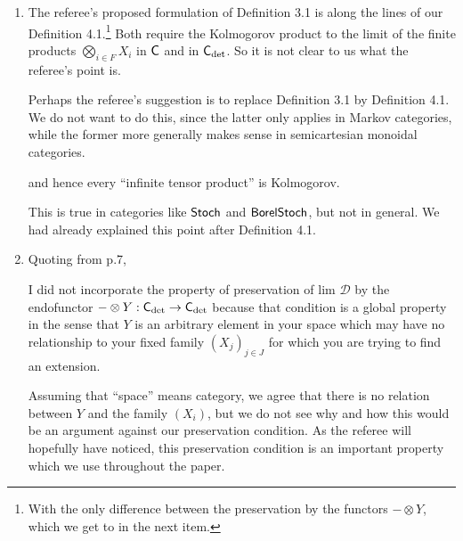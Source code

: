 \documentclass[11pt]{article}
\begin{document}
\begin{enumerate}[resume,label=(\alph*).]
	\item The referee's proposed formulation of Definition 3.1 is along the lines of our Definition 4.1.\footnote{With the only difference between the preservation by the functors $-\otimes Y$, which we get to in the next item.} Both require the Kolmogorov product to the limit of the finite products $\bigotimes_{i \in F} X_i$ in $\mathsf{C}$ and in $\mathsf{C}_{\det}$. So it is not clear to us what the referee's point is. 

		Perhaps the referee's suggestion is to replace Definition 3.1 by Definition 4.1. We do not want to do this, since the latter only applies in Markov categories, while the former more generally makes sense in semicartesian monoidal categories.
		\begin{displayquote}
			and hence every ``infinite tensor product'' is Kolmogorov.
		\end{displayquote}
		This is true in categories like $\operatorname{\mathsf{Stoch}}$ and $\operatorname{\mathsf{BorelStoch}}$, but not in general. We had already explained this point after Definition 4.1.
	\item Quoting from p.7,
		\begin{displayquote}
			I did not incorporate the property of preservation of lim $\mathcal{D}$ by the endofunctor
			$-\otimes Y : \mathsf{C}_{\det} \to \mathsf{C}_{\det}$ because that condition is a global property in the sense
		that $Y$ is an arbitrary element in your space which may have no relationship
		to your fixed family $(X_j)_{j\in J}$ for which you are trying to find an extension.
		\end{displayquote}
		Assuming that ``space'' means category, we agree that there is no relation between $Y$ and the family $(X_i)$, but we do not see why and how this would be an argument against our preservation condition. As the referee will hopefully have noticed, this preservation condition is an important property which we use throughout the paper.


\end{enumerate}
\end{document}
